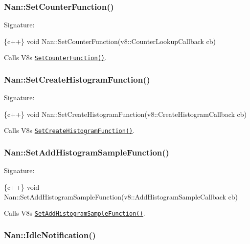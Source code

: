 \label{_api_nan_set_counter_function}%
 \subsubsection*{Nan\+::\+Set\+Counter\+Function()}

Signature\+:


\begin{DoxyCode}
\{c++\}
void Nan::SetCounterFunction(v8::CounterLookupCallback cb)
\end{DoxyCode}


Calls V8\textquotesingle{}s \href{https://v8docs.nodesource.com/io.js-3.0/d5/dda/classv8_1_1_isolate.html#a045d7754e62fa0ec72ae6c259b29af94}{\tt {\ttfamily Set\+Counter\+Function()}}.

\label{_api_nan_set_create_histogram_function}%
 \subsubsection*{Nan\+::\+Set\+Create\+Histogram\+Function()}

Signature\+:


\begin{DoxyCode}
\{c++\}
void Nan::SetCreateHistogramFunction(v8::CreateHistogramCallback cb) 
\end{DoxyCode}


Calls V8\textquotesingle{}s \href{https://v8docs.nodesource.com/io.js-3.0/d5/dda/classv8_1_1_isolate.html#a542d67e85089cb3f92aadf032f99e732}{\tt {\ttfamily Set\+Create\+Histogram\+Function()}}.

\label{_api_nan_set_add_histogram_sample_function}%
 \subsubsection*{Nan\+::\+Set\+Add\+Histogram\+Sample\+Function()}

Signature\+:


\begin{DoxyCode}
\{c++\}
void Nan::SetAddHistogramSampleFunction(v8::AddHistogramSampleCallback cb) 
\end{DoxyCode}


Calls V8\textquotesingle{}s \href{https://v8docs.nodesource.com/io.js-3.0/d5/dda/classv8_1_1_isolate.html#aeb420b690bc2c216882d6fdd00ddd3ea}{\tt {\ttfamily Set\+Add\+Histogram\+Sample\+Function()}}.

\label{_api_nan_idle_notification}%
 \subsubsection*{Nan\+::\+Idle\+Notification()}

